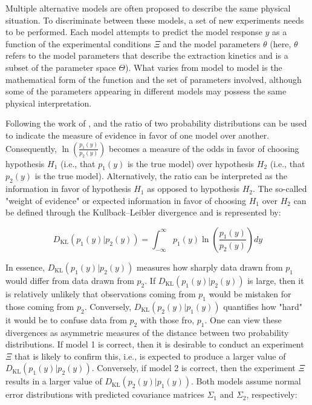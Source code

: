\documentclass[../Article_Design_of_Experiment.tex]{subfiles}
\begin{document}
	
	Multiple alternative models are often proposed to describe the same physical situation. To discriminate between these models, a set of new experiments needs to be performed. Each model attempts to predict the model response $y$ as a function of the experimental conditions $\Xi$ and the model parameters $\theta$ (here, $\theta$ refers to the model parameters that describe the extraction kinetics and is a subset of the parameter space $\Theta$). What varies from model to model is the mathematical form of the function and the set of parameters involved, although some of the parameters appearing in different models may possess the same physical interpretation.
	
	Following the work of \citet{Box1967}, \citet{Himmelblau1970} and \citet{Bard1974} the ratio of two probability distributions can be used to indicate the measure of evidence in favor of one model over another. Consequently, $\ln\left( \frac{p_1(y)}{p_2(y)} \right)$ becomes a measure of the odds in favor of choosing hypothesis $H_1$ (i.e., that $p_1(y)$ is the true model) over hypothesis $H_2$ (i.e., that $p_2(y)$ is the true model). Alternatively, the ratio can be interpreted as the information in favor of hypothesis $H_1$ as opposed to hypothesis $H_2$. The so-called "weight of evidence" or expected information in favor of choosing $H_1$ over $H_2$ can be defined through the Kullback–Leibler divergence and is represented by:
	
	{\footnotesize \begin{equation} D_{\mathrm{KL}}\left( p_1(y) | p_2(y) \right) = \int_{-\infty}^{\infty} p_1(y) \ln\left( \frac{p_1(y)}{p_2(y)} \right) dy \end{equation} }
	
	In essence, $D_{\mathrm{KL}}(p_1(y)|p_2(y))$ measures how sharply data drawn from $p_1$ would differ from data drawn from $p_2$. If $D_{\mathrm{KL}}(p_1(y)|p_2(y))$ is large, then it is relatively unlikely that observations coming from $p_1$ would be mistaken for those coming from $p_2$. Conversely, $D_{\mathrm{KL}}(p_2(y)|p_1(y))$ quantifies how "hard" it would be to confuse data from $p_2$ with those fro, $p_1$. One can view these divergences as asymmetric measures of the distance between two probability distributions. If model 1 is correct, then it is desirable to conduct an experiment $\Xi$ that is likely to confirm this, i.e., is expected to produce a larger value of $D_{\mathrm{KL}}\left( p_1(y) | p_2(y) \right)$. Conversely, if model 2 is correct, then the experiment $\Xi$ results in a larger value of $D_{\mathrm{KL}}\left( p_2(y) | p_1(y) \right)$. Both models assume normal error distributions with predicted covariance matrices $\Sigma_1$ and $\Sigma_2$, respectively:
	
\end{document}
